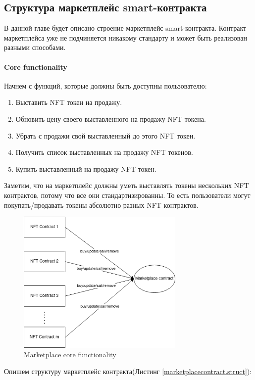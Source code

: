 \subsection{Структура маркетплейс smart-контракта}

В данной главе будет описано строение маркетплейс smart-контракта. Контракт маркетплейса уже не подчиняется никакому стандарту и может быть реализован разными способами.

\paragraph{Core functionality}

Начнем с функций, которые должны быть доступны пользователю:
\begin{enumerate}
    \item Выставить NFT токен на продажу.
    \item Обновить цену своего выставленного на продажу NFT токена.
    \item Убрать с продажи свой выставленный до этого NFT токен.
    \item Получить список выставленных на продажу NFT токенов.
    \item Купить выставленный на продажу NFT токен.
\end{enumerate}

Заметим, что на маркетплейс должны уметь выставлять токены нескольких NFT контрактов, потому что все они стандартизированны.
То есть пользователи могут покупать/продавать токены абсолютно разных NFT контрактов.

\begin{figure}[h!]
	\centering
	\includegraphics[height=70mm]{fig/marketplace.png}
	\caption{Marketplace core functionality}
\end{figure}

Опишем структуру маркетплейс контракта(Листинг {\color{blue}\ref{marketplacecontract.struct}}):

